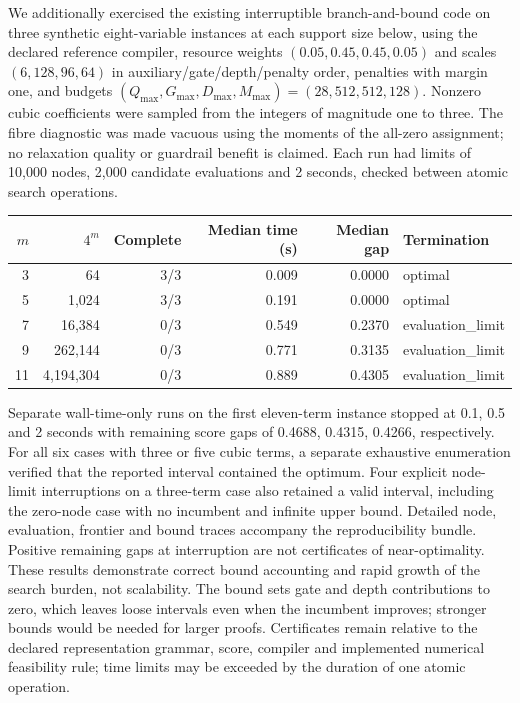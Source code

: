 We additionally exercised the existing interruptible branch-and-bound code on
three synthetic eight-variable instances at each support size below, using the
declared reference compiler, resource weights $(0.05,0.45,0.45,0.05)$ and
scales $(6,128,96,64)$ in auxiliary/gate/depth/penalty order, penalties with margin one, and
budgets $(Q_{\max},G_{\max},D_{\max},M_{\max})=(28,512,512,128)$.
Nonzero cubic coefficients were sampled from the integers of magnitude one to three.
The fibre diagnostic was made
vacuous using the moments of the all-zero assignment; no relaxation quality or
guardrail benefit is claimed. Each run had limits of 10,000 nodes, 2,000 candidate
evaluations and 2 seconds, checked between atomic search operations.
\begin{center}\begin{tabular}{rrrrrl}
\toprule
$m$ & $4^m$ & Complete & Median time (s) & Median gap & Termination\\
\midrule
3 & 64 & 3/3 & 0.009 & 0.0000 & optimal\\
5 & 1,024 & 3/3 & 0.191 & 0.0000 & optimal\\
7 & 16,384 & 0/3 & 0.549 & 0.2370 & evaluation\_limit\\
9 & 262,144 & 0/3 & 0.771 & 0.3135 & evaluation\_limit\\
11 & 4,194,304 & 0/3 & 0.889 & 0.4305 & evaluation\_limit\\
\bottomrule\end{tabular}\end{center}
Separate wall-time-only runs on the first eleven-term instance stopped at
0.1, 0.5 and 2 seconds with remaining score gaps of 0.4688, 0.4315, 0.4266, respectively.
For all six cases with three or five cubic terms, a separate exhaustive enumeration
verified that the reported interval contained the optimum. Four explicit node-limit
interruptions on a three-term case also retained a valid interval, including the
zero-node case with no incumbent and infinite upper bound. Detailed node, evaluation,
frontier and bound traces accompany the reproducibility bundle. Positive remaining
gaps at interruption are not certificates of near-optimality. These results demonstrate
correct bound accounting and rapid growth of the search burden, not scalability.
The bound sets gate and depth contributions to zero, which leaves loose intervals
even when the incumbent improves; stronger bounds would be needed for larger proofs.
Certificates remain relative to the declared representation grammar, score, compiler
and implemented numerical feasibility rule; time limits may be exceeded by the duration
of one atomic operation.
